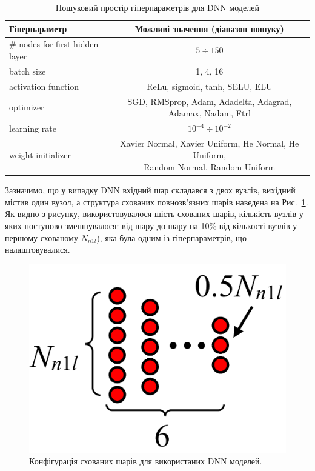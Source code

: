 \documentclass[14pt,a4paper,titlepage,oneside]{book}
\numberwithin{equation}{part}
\begin{document}
\begin{table}[!ht]
\caption{Пошуковий простір гіперпараметрів для DNN моделей }
\label{tblDNNs}
\centering
\begin{tabular}{|l|c|}
\hline
Гіперпараметр&Можливі значення (діапазон пошуку)\\
\hline
\# nodes for first hidden layer &$5\div150$\\
\hline
batch size&	1, 4, 16\\
\hline
activation function &	ReLu, sigmoid, tanh, SELU, ELU\\
\hline
optimizer	&SGD, RMSprop, Adam, Adadelta, Adagrad, Adamax, Nadam, Ftrl\\
\hline
learning rate	& $10^{-4}\div10^{-2}$ \\
\hline
weight initializer &	\makecell{Xavier Normal, Xavier Uniform, He Normal, He Uniform, \\Random Normal, Random Uniform}\\
\hline
\end{tabular}
\end{table}

Зазначимо, що у випадку DNN вхідний шар складався з двох вузлів, вихідний містив один вузол,
а структура схованих повнозв'язних шарів наведена на Рис.~\ref{figDNNc}.
Як видно з рисунку, використовувалося шість схованих шарів, кількість вузлів у яких поступово зменшувалося:
від шару до шару на 10\% від кількості вузлів у першому схованому $N_{n1l}$), яка була одним із гіперпараметрів, що налаштовувалися.


\begin{figure}
	\centering
     \includegraphics[width=0.5\linewidth]{Fig22.png}
	  \caption{Конфігурація схованих шарів для використаних DNN моделей.
}\label{figDNNc}
\end{figure}
\end{document}
